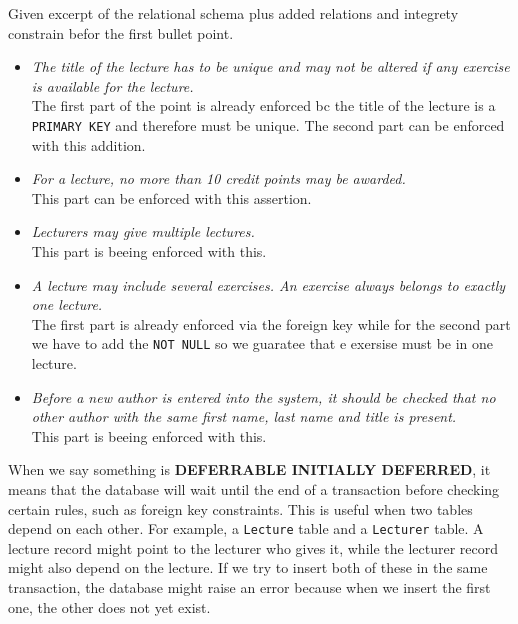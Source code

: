 \documentclass{article}
\begin{document}
\printfront

\task{}
Given excerpt of the relational schema plus added relations and integrety constrain befor the first bullet point.

\newpage
\begin{itemize}
    \item 
    \textit{The title of the lecture has to be unique and may not be altered if any exercise is
    available for the lecture.}\\
    The first part of the point is already enforced bc the title of the lecture is a \texttt{PRIMARY KEY} and therefore must be unique. The second part can be enforced with this addition.
    
    \item 
    \textit{For a lecture, no more than 10 credit points may be awarded.}\\
    This part can be enforced with this assertion.
    
    \item 
    \textit{Lecturers may give multiple lectures.}\\
    This part is beeing enforced with this.
    
    \item 
    \textit{A lecture may include several exercises. An exercise always belongs to exactly one
    lecture.}\\
    The first part is already enforced via the foreign key while for the second part we have to add the \texttt{NOT NULL} so we guaratee that e exersise must be in one lecture.
    
    \item 
    \textit{Before a new author is entered into the system, it should be checked that no other
    author with the same first name, last name and title is present.}\\
    This part is beeing enforced with this.
    

\end{itemize}


\task{}

\task{}

\task{}
When we say something is \textbf{DEFERRABLE INITIALLY DEFERRED}, it means that the database will wait until the end of a transaction before checking certain rules, such as foreign key constraints. This is useful when two tables depend on each other. For example, a \texttt{Lecture} table and a \texttt{Lecturer} table. A lecture record might point to the lecturer who gives it, while the lecturer record might also depend on the lecture. If we try to insert both of these in the same transaction, the database might raise an error because when we insert the first one, the other does not yet exist.
\end{document}

